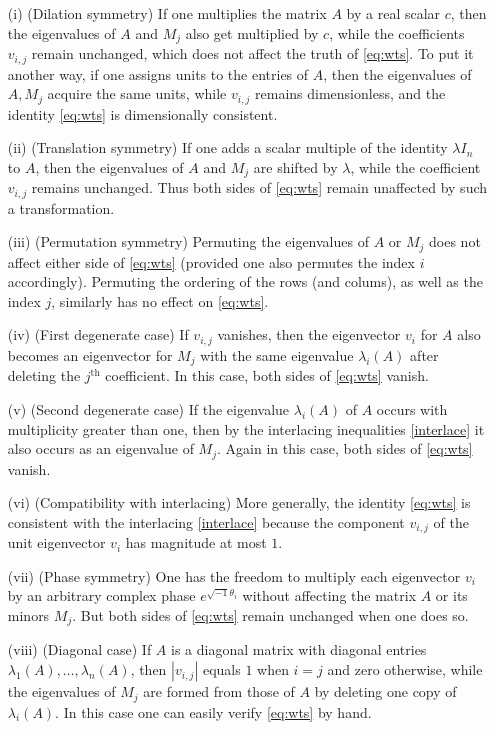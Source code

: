 \documentclass{amsart}
\begin{document}
\begin{itemize}
\item[(i)] (Dilation symmetry) If one multiplies the matrix $A$ by a real scalar $c$, then the eigenvalues of $A$ and $M_j$ also get multiplied by $c$, while the coefficients $v_{i,j}$ remain unchanged, which does not affect the truth of \eqref{eq:wts}.  To put it another way, if one assigns units to the entries of $A$, then the eigenvalues of $A,M_j$ acquire the same units, while $v_{i,j}$ remains dimensionless, and the identity \eqref{eq:wts} is dimensionally consistent.
\item[(ii)] (Translation symmetry) If one adds a scalar multiple of the identity $\lambda I_n$ to $A$, then the eigenvalues of $A$ and $M_j$ are shifted by $\lambda$, while the coefficient $v_{i,j}$ remains unchanged.  Thus both sides of \eqref{eq:wts} remain unaffected by such a transformation.
\item[(iii)]  (Permutation symmetry) Permuting the eigenvalues of $A$ or $M_j$ does not affect either side of \eqref{eq:wts} (provided one also permutes the index $i$ accordingly).  Permuting the ordering of the rows (and colums), as well as the index $j$, similarly has no effect on \eqref{eq:wts}.
\item[(iv)]  (First degenerate case) If $v_{i,j}$ vanishes, then the eigenvector $v_i$ for $A$ also becomes an eigenvector for $M_j$ with the same eigenvalue $\lambda_i(A)$ after deleting the $j^{\mathrm{th}}$ coefficient.  In this case, both sides of \eqref{eq:wts} vanish.  
\item[(v)]  (Second degenerate case) If the eigenvalue $\lambda_i(A)$ of $A$ occurs with multiplicity greater than one, then by the interlacing inequalities \eqref{interlace} it also occurs as an eigenvalue of $M_j$.  Again in this case, both sides of \eqref{eq:wts} vanish.
\item[(vi)]  (Compatibility with interlacing) More generally, the identity \eqref{eq:wts} is consistent with the interlacing \eqref{interlace} because the component $v_{i,j}$ of the unit eigenvector $v_i$ has magnitude at most $1$.
\item[(vii)]  (Phase symmetry) One has the freedom to multiply each eigenvector $v_i$ by an arbitrary complex phase $e^{\sqrt{-1}\theta_i}$ without affecting the matrix $A$ or its minors $M_j$.  But both sides of \eqref{eq:wts} remain unchanged when one does so.
\item[(viii)]  (Diagonal case) If $A$ is a diagonal matrix with diagonal entries $\lambda_1(A),\dots,\lambda_n(A)$, then $|v_{i,j}|$ equals $1$ when $i=j$ and zero otherwise, while the eigenvalues of $M_j$ are formed from those of $A$ by deleting one copy of $\lambda_i(A)$.  In this case one can easily verify \eqref{eq:wts} by hand.

\end{itemize}
\end{document}

